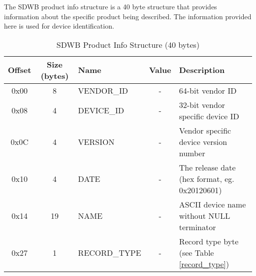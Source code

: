 \documentclass[a4paper, 12pt]{article}
\begin{document}
The SDWB product info structure is a 40 byte structure that provides information about
the specific product being described. The information provided here is used for device
identification.

\begin{center}
  \begin{savenotes}
    \begin{table}[!ht]\footnotesize
      \caption{SDWB Product Info Structure (40 bytes)}\label{sdwb_product_struct}\centering
        \begin{tabular}{| c | c | l | c | p{5cm} |} \hline
        Offset & Size (bytes) & Name & Value & Description \\ \hline
        0x00 & 8 & VENDOR\_ID & - & 64-bit vendor ID \\ \hline
        0x08 & 4 & DEVICE\_ID & - & 32-bit vendor specific device ID \\ \hline
        0x0C & 4 & VERSION & - & Vendor specific device version number \\ \hline
        0x10 & 4 & DATE & - & The release date (hex format, eg. 0x20120601) \\ \hline
        0x14 & 19 & NAME & - & ASCII device name without NULL terminator \\ \hline
        0x27 & 1 & RECORD\_TYPE & - & Record type byte (see Table \ref{record_type}) \\ \hline
        \end{tabular}
    \end{table}
  \end{savenotes}
\end{center}
\end{document}
